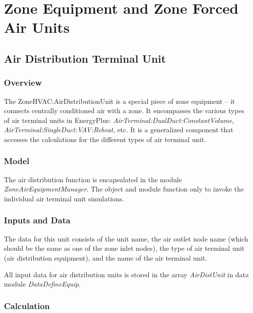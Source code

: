 \section{Zone Equipment and Zone Forced Air Units }\label{zone-equipment-and-zone-forced-air-units}

\subsection{Air Distribution Terminal Unit}\label{air-distribution-terminal-unit}

\subsubsection{Overview}\label{overview-031}

The ZoneHVAC:AirDistributionUnit is a special piece of zone equipment -- it connects centrally conditioned air with a zone. It encompasses the various types of air terminal units in EnergyPlus: \emph{AirTerminal:DualDuct:ConstantVolume}, \emph{AirTerminal:SingleDuct:VAV:Reheat}, etc. It is a generalized component that accesses the calculations for the different types of air terminal unit.

\subsubsection{Model}\label{model-003}

The air distribution function is encapsulated in the module \emph{ZoneAirEquipmentManager}. The object and module function only to invoke the individual air terminal unit simulations.

\subsubsection{Inputs and Data}\label{inputs-and-data-002}

The data for this unit consists of the unit name, the air outlet node name (which should be the same as one of the zone inlet nodes), the type of air terminal unit (air distribution equipment), and the name of the air terminal unit.

All input data for air distribution units is stored in the array \emph{AirDistUnit} in data module \emph{DataDefineEquip}.

\subsubsection{Calculation}\label{calculation-000}

